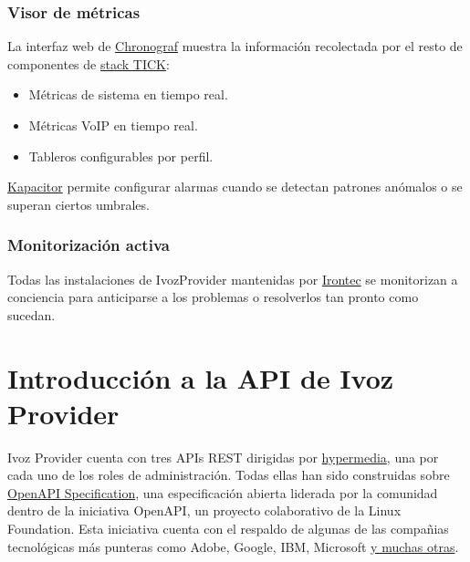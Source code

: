 \documentclass[letterpaper,10pt,spanish]{sphinxmanual}
\begin{document}
\subsection{Visor de métricas}
\label{security_and_maintenance/maintenance/other_tools:metrics-viewer}
La interfaz web de \href{https://www.influxdata.com/time-series-platform/chronograf/}{Chronograf} muestra la información recolectada por el resto de componentes de \href{https://www.influxdata.com/time-series-platform/}{stack TICK}:
\begin{itemize}
\item {} 
Métricas de sistema en tiempo real.

\item {} 
Métricas VoIP en tiempo real.

\item {} 
Tableros configurables por perfil.

\end{itemize}

\href{https://www.influxdata.com/time-series-platform/kapacitor/}{Kapacitor} permite configurar alarmas cuando se detectan patrones anómalos  o se superan ciertos umbrales.


\subsection{Monitorización activa}
\label{security_and_maintenance/maintenance/other_tools:active-monitoring}
Todas las instalaciones de IvozProvider mantenidas por \href{https://www.irontec.com}{Irontec} se monitorizan a conciencia para anticiparse a los problemas o resolverlos tan pronto como sucedan.


\chapter{Introducción a la API de Ivoz Provider}
\label{api_rest/introduction:introduction-to-ivozprovider-api}\label{api_rest/introduction::doc}
Ivoz Provider cuenta con tres APIs REST dirigidas por \href{https://en.wikipedia.org/wiki/HATEOAS}{hypermedia}, una por cada uno de los roles de administración. Todas ellas han sido construidas sobre \href{https://www.openapis.org/}{OpenAPI Specification}, una especificación abierta liderada por la comunidad dentro de la iniciativa OpenAPI, un proyecto colaborativo de la Linux Foundation. Esta iniciativa cuenta con el respaldo de algunas de las compañias tecnológicas más punteras como Adobe, Google, IBM, Microsoft \href{https://www.openapis.org/membership/members)}{y muchas otras}.
\end{document}
